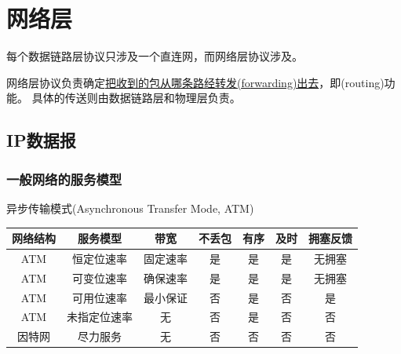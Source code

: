 
\section{网络层}
每个数据链路层协议只涉及一个直连网，而网络层协议涉及。

网络层协议负责确定\underline{把收到的包从哪条路经转发(forwarding)出去}，即(routing)功能。
具体的传送则由数据链路层和物理层负责。

\subsection{IP数据报}
\subsubsection{一般网络的服务模型}
异步传输模式(Asynchronous Transfer Mode, ATM)
\begin{center}
\begin{tabular}{|c|c|c|c|c|c|c|}\hline
网络结构 & 服务模型 & 带宽 & 不丢包 & 有序 & 及时 & 拥塞反馈\\\hline
ATM & 恒定位速率 & 固定速率 & 是 & 是 & 是 & 无拥塞\\\hline
ATM & 可变位速率 & 确保速率 & 是 & 是 & 是 & 无拥塞\\\hline
ATM & 可用位速率 & 最小保证 & 否 & 是 & 否 & 是\\\hline
ATM & 未指定位速率 & 无 & 否 & 是 & 否 & 否\\\hline
因特网 & 尽力服务 & 无 & 否 & 否 & 否 & 否\\\hline
\end{tabular}
\end{center}

